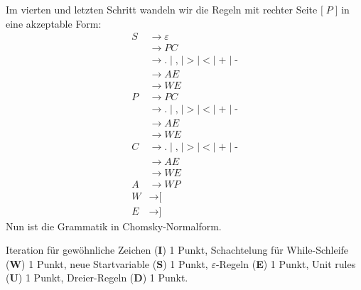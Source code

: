 \begin{loesung}
Im vierten und letzten Schritt wandeln wir die Regeln mit rechter Seite
$\texttt{[}\;P\;\texttt{]}$ in eine akzeptable Form:
\begin{align*}
S&\rightarrow\varepsilon
\\
&\rightarrow P C
\\
&\rightarrow
\texttt{.} \;|\;
\texttt{,} \;|\;
\texttt{>} \;|\;
\texttt{<} \;|\;
\texttt{+} \;|\;
\texttt{-}
\\
&\rightarrow AE
\\
&\rightarrow WE
\\
P&\rightarrow P C
\\
&\rightarrow
\texttt{.} \;|\;
\texttt{,} \;|\;
\texttt{>} \;|\;
\texttt{<} \;|\;
\texttt{+} \;|\;
\texttt{-}
\\
&\rightarrow AE
\\
&\rightarrow WE
\\
C&\rightarrow
\texttt{.} \;|\;
\texttt{,} \;|\;
\texttt{>} \;|\;
\texttt{<} \;|\;
\texttt{+} \;|\;
\texttt{-}
\\
&\rightarrow AE
\\
&\rightarrow WE
\\
A&\rightarrow W P
\\
W&\rightarrow\texttt{[}
\\
E&\rightarrow\texttt{]}
\end{align*}
Nun ist die Grammatik in Chomsky-Normalform.
\end{loesung}

\begin{bewertung}
Iteration für gewöhnliche Zeichen ({\bf I}) 1 Punkt,
Schachtelung für While-Schleife ({\bf W}) 1 Punkt,
neue Startvariable ({\bf S}) 1 Punkt,
$\varepsilon$-Regeln ({\bf E}) 1 Punkt,
Unit rules ({\bf U}) 1 Punkt,
Dreier-Regeln ({\bf D}) 1 Punkt.
\end{bewertung}

